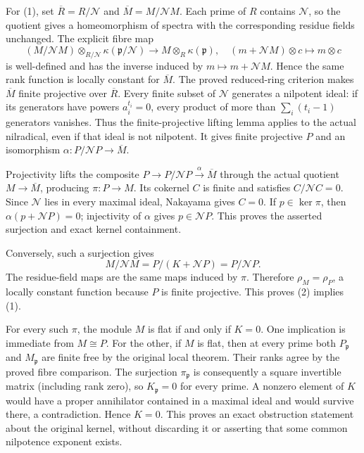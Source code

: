 For (1), set \(\overline R=R/\mathcal N\) and \(\overline M=M/\mathcal NM\). Each prime of \(R\) contains \(\mathcal N\), so the quotient gives a homeomorphism of spectra with the corresponding residue fields unchanged. The explicit fibre map \[
(M/\mathcal NM)\otimes_{R/\mathcal N}\kappa(\mathfrak p/\mathcal N)
\longrightarrow M\otimes_R\kappa(\mathfrak p),
\quad (m+\mathcal NM)\otimes c\longmapsto m\otimes c
\] is well-defined and has the inverse induced by \(m\mapsto m+\mathcal NM\). Hence the same rank function is locally constant for \(\overline M\). The proved reduced-ring criterion makes \(\overline M\) finite projective over \(\overline R\). Every finite subset of \(\mathcal N\) generates a nilpotent ideal: if its generators have powers \(a_i^{t_i}=0\), every product of more than \(\sum_i(t_i-1)\) generators vanishes. Thus the finite-projective lifting lemma applies to the actual nilradical, even if that ideal is not nilpotent. It gives finite projective \(P\) and an isomorphism \(\alpha:P/\mathcal NP\to\overline M\).

Projectivity lifts the composite \(P\to P/\mathcal NP\xrightarrow\alpha\overline M\) through the actual quotient \(M\to\overline M\), producing \(\pi:P\to M\). Its cokernel \(C\) is finite and satisfies \(C/\mathcal NC=0\). Since \(\mathcal N\) lies in every maximal ideal, Nakayama gives \(C=0\). If \(p\in\ker\pi\), then \(\alpha(p+\mathcal NP)=0\); injectivity of \(\alpha\) gives \(p\in\mathcal NP\). This proves the asserted surjection and exact kernel containment.

Conversely, such a surjection gives \[
M/\mathcal NM=P/(K+\mathcal NP)=P/\mathcal NP.
\] The residue-field maps are the same maps induced by \(\pi\). Therefore \(\rho_M=\rho_P\), a locally constant function because \(P\) is finite projective. This proves (2) implies (1).

For every such \(\pi\), the module \(M\) is flat if and only if \(K=0\). One implication is immediate from \(M\cong P\). For the other, if \(M\) is flat, then at every prime both \(P_{\mathfrak p}\) and \(M_{\mathfrak p}\) are finite free by the original local theorem. Their ranks agree by the proved fibre comparison. The surjection \(\pi_{\mathfrak p}\) is consequently a square invertible matrix (including rank zero), so \(K_{\mathfrak p}=0\) for every prime. A nonzero element of \(K\) would have a proper annihilator contained in a maximal ideal and would survive there, a contradiction. Hence \(K=0\). This proves an exact obstruction statement about the original kernel, without discarding it or asserting that some common nilpotence exponent exists.

